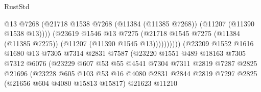 \begin{lexlean}{RustStd}
\begin{coremodule}
                                            @13
                                            @7268
                                            (@21718
                                              @1538
                                              @7268
                                              (@11384 (@11385 @7268))
                                              (@11207 (@11390 @1538 @13))))
                                          (@23619
                                            @1546
                                            @13
                                            @7275
                                            (@21718
                                              @1545
                                              @7275
                                              (@11384 (@11385 @7275))
                                              (@11207 (@11390 @1545 @13))))))))))
                              (@23209
                                @1552
                                @1616
                                @1680
                                @13
                                @7305
                                @7314
                                @2831
                                @7587
                                (@23220
                                  @1551
                                  @489
                                  @18163
                                  @7305
                                  @7312
                                  @6076
                                  (@23229
                                    @607
                                    @53
                                    @55
                                    @4541
                                    @7304
                                    @7311
                                    @2819
                                    @7287
                                    @2825
                                    @21696
                                    (@23228
                                      @605
                                      @103
                                      @53
                                      @16
                                      @4080
                                      @2831
                                      @2844
                                      @2819
                                      @7297
                                      @2825
                                      (@21656 @604 @4080 @15813 @15817)
                                      @21623
                                      @11210

\end{coremodule}
\end{lexlean}
